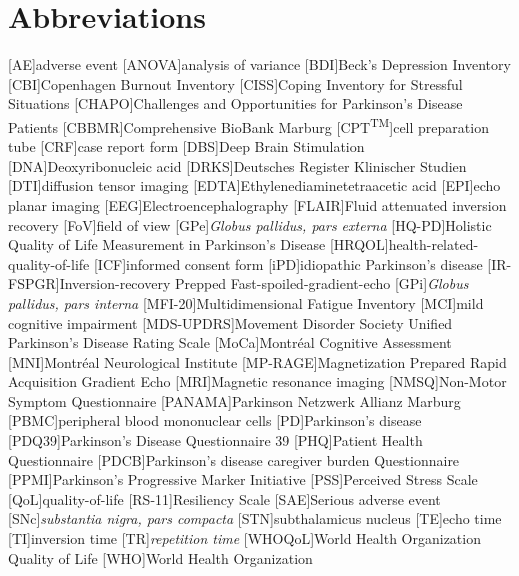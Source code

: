 \chapter*{Abbreviations}
\let\oldbaselinestretch=\baselinestretch%
\renewcommand{\baselinestretch}{1}%
\large\normalsize%
\thispagestyle{plain}
\begin{multicols}{2}
\begin{acronym}
\setlength{\parskip}{0ex}
[AE]{adverse event}
[ANOVA]{analysis of variance}
[BDI]{Beck's Depression Inventory}
[CBI]{Copenhagen Burnout Inventory}
[CISS]{Coping Inventory for Stressful Situations}
[CHAPO]{Challenges and Opportunities for Parkinson's Disease Patients}
[CBBMR]{Comprehensive BioBank Marburg}
[CPT\textsuperscript{TM}]{cell preparation tube}
[CRF]{case report form}
[DBS]{Deep Brain Stimulation}
[DNA]{Deoxyribonucleic acid}
[DRKS]{Deutsches Register Klinischer Studien}
[DTI]{diffusion tensor imaging}
[EDTA]{Ethylenediaminetetraacetic acid}
[EPI]{echo planar imaging}
[EEG]{Electroencephalography}
[FLAIR]{Fluid attenuated inversion recovery}
[FoV]{field of view}
[GPe]{\textit{Globus pallidus, pars externa}}
[HQ-PD]{Holistic Quality of Life Measurement in Parkinson's Disease}
[HRQOL]{health-related-quality-of-life}
[ICF]{informed consent form}
[iPD]{idiopathic Parkinson's disease}
[IR-FSPGR]{Inversion-recovery Prepped Fast-spoiled-gradient-echo}
[GPi]{\textit{Globus pallidus, pars interna}}
[MFI-20]{Multidimensional Fatigue Inventory}
[MCI]{mild cognitive impairment}
[MDS-UPDRS]{Movement Disorder Society Unified Parkinson's Disease Rating Scale}
[MoCa]{Montréal Cognitive Assessment}
[MNI]{Montréal Neurological Institute}
[MP-RAGE]{Magnetization Prepared Rapid Acquisition Gradient Echo}
[MRI]{Magnetic resonance imaging}
[NMSQ]{Non-Motor Symptom Questionnaire}
[PANAMA]{Parkinson Netzwerk Allianz Marburg}
[PBMC]{peripheral blood mononuclear cells}
[PD]{Parkinson's disease}
[PDQ39]{Parkinson's Disease Questionnaire 39}
[PHQ]{Patient Health Questionnaire}
[PDCB]{Parkinson’s disease caregiver burden Questionnaire}
[PPMI]{Parkinson's Progressive Marker Initiative}
[PSS]{Perceived Stress Scale}
[QoL]{quality-of-life}
[RS-11]{Resiliency Scale}
[SAE]{Serious adverse event}
[SNc]{\textit{substantia nigra, pars compacta}}
[STN]{subthalamicus nucleus}
[TE]{echo time}
[TI]{inversion time}
[TR]{\textit{repetition time}}
[WHOQoL]{World Health Organization Quality of Life}
[WHO]{World Health Organization}
\end{acronym}
\renewcommand{\baselinestretch}{\oldbaselinestretch}%
\large\normalsize%
\end{multicols}
